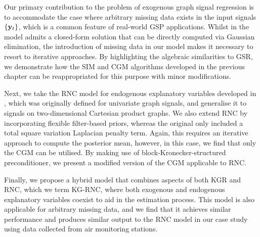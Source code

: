 Our primary contribution to the problem of exogenous graph signal regression is to accommodate the case where arbitrary missing data exists in the input signals $\{\mathbf{y}_t\}$, which is a common feature of real-world GSP applications. Whilst in \cite{Venkitaraman2019,Venkitaraman2020} the model admits a closed-form solution that can be directly computed via Gaussian elimination, the introduction of missing data in our model makes it necessary to resort to iterative approaches. By highlighting the algebraic similarities to GSR, we demonstrate how the SIM and CGM algorithms developed in the previous chapter can be reappropriated for this purpose with minor modifications. 

Next, we take the RNC model for endogenous explanatory variables developed in \cite{Li2019}, which was originally defined for univariate graph signals, and generalise it to signals on two-dimensional Cartesian product graphs. We also extend RNC by incorporating flexible filter-based priors, whereas the original only included a total square variation Laplacian penalty term. Again, this requires an iterative approach to compute the posterior mean, however, in this case, we find that only the CGM can be utilised. By making use of block-Kronecker-structured preconditioner, we present a modified version of the CGM applicable to RNC. 

Finally, we propose a hybrid model that combines aspects of both KGR and RNC, which we term KG-RNC, where both exogenous and endogenous explanatory variables coexist to aid in the estimation process. This model is also applicable for arbitrary missing data, and we find that it achieves similar performance and produces similar output to the RNC model in our case study using data collected from air monitoring stations. 

